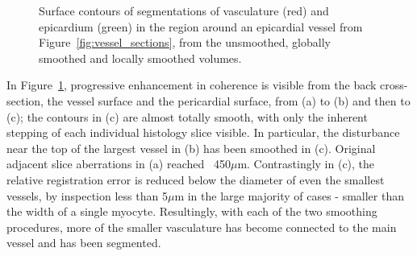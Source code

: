   \begin{figure}[!t]
    \centerline{ \hfil
     \hfil
    }
    \caption{Surface contours of segmentations of vasculature (red) and epicardium (green) in the region around an epicardial vessel from Figure~\ref{fig:vessel_sections}, from the unsmoothed, globally smoothed and locally smoothed volumes.}
    \label{fig:region_segmentations}
  \end{figure} 
  In Figure~\ref{fig:region_segmentations}, progressive enhancement in coherence is visible from the back cross-section, the vessel surface and the pericardial surface, from (a) to (b) and then to (c); the contours in (c) are almost totally smooth, with only the inherent stepping of each individual histology slice visible. In particular, the disturbance near the top of the largest vessel in (b) has been smoothed in (c). Original adjacent slice aberrations in (a) reached ~450$\mu$m. Contrastingly in (c), the relative registration error is reduced below the diameter of even the smallest vessels, by inspection less than 5$\mu$m in the large majority of cases - smaller than the width of a single myocyte. Resultingly, with each of the two smoothing procedures, more of the smaller vasculature has become connected to the main vessel and has been segmented.
    
